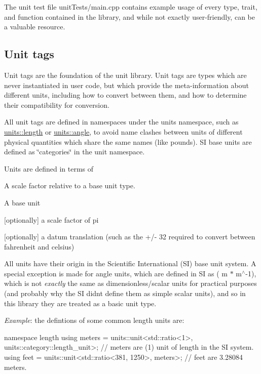 The unit test file {\ttfamily unit\+Tests/main.\+cpp} contains example usage of every type, trait, and function contained in the library, and while not exactly user-\/friendly, can be a valuable resource.

\subsection*{Unit tags }

Unit tags are the foundation of the unit library. Unit tags are types which are never instantiated in user code, but which provide the meta-\/information about different units, including how to convert between them, and how to determine their compatibility for conversion.

All unit tags are defined in namespaces under the {\ttfamily units} namespace, such as {\ttfamily \hyperlink{namespaceunits_1_1length}{units\+::length}} or {\ttfamily \hyperlink{namespaceunits_1_1angle}{units\+::angle}}, to avoid name clashes between units of different physical quantities which share the same names (like pounds). S\+I base units are defined as \char`\"{}categories\char`\"{} in the {\ttfamily unit} namespace.

Units are defined in terms of
\begin{DoxyEnumerate}
\item A scale factor relative to a base unit type.
\item A base unit
\item \mbox{[}optionally\mbox{]} a scale factor of {\ttfamily pi}
\item \mbox{[}optionally\mbox{]} a datum translation (such as the +/-\/ 32 required to convert between {\ttfamily fahrenheit} and {\ttfamily celsius})
\end{DoxyEnumerate}

All units have their origin in the Scientific International (S\+I) base unit system. A special exception is made for angle units, which are defined in S\+I as ( m $\ast$ m$^\wedge$-\/1), which is not {\itshape exactly} the same as dimensionless/scalar units for practical purposes (and probably why the S\+I didn\textquotesingle{}t define them as simple scalar units), and so in this library they are treated as a basic unit type.

{\itshape Example}\+: the defintions of some common length units are\+: \begin{DoxyVerb}namespace length
{
    using meters = units::unit<std::ratio<1>, units::category::length_unit>;    // meters are (1) unit of length in the SI system.
    using feet = units::unit<std::ratio<381, 1250>, meters>;                    // feet are 3.28084 meters.
}
\end{DoxyVerb}


